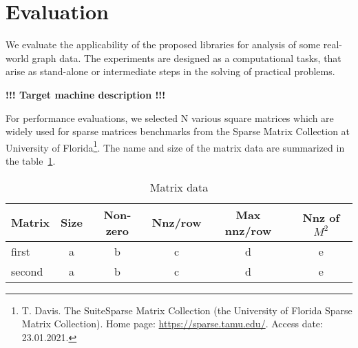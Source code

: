 \section{Evaluation}



We evaluate the applicability of the proposed libraries for analysis of some real-world graph data.
The experiments are designed as a computational tasks, that arise as stand-alone or intermediate steps
in the solving of practical problems.  

\textbf{!!! Target machine description !!!}

For performance evaluations, we selected N various square matrices which are widely used for sparse matrices benchmarks
from the Sparse Matrix Collection at University of Florida\footnote{T. Davis. The SuiteSparse Matrix Collection (the University of Florida Sparse Matrix Collection). Home page: \url{https://sparse.tamu.edu/}. Access date: 23.01.2021.}.
The name and size of the matrix data are summarized in the table~\ref{table:sparse_matrices}. 




{\setlength{\tabcolsep}{0.3em}
\begin{table}
\centering
{
\caption{Matrix data}
\label{table:sparse_matrices}
\scriptsize
{}
\begin{tabular}{|l|c|c|c|c|c|}
\hline
Matrix          & Size       & Non-zero   & Nnz/row   & Max nnz/row & Nnz of $M^2$ \\
\hline
\hline
first           & a          & b          & c         & d            & e              \\
second          & a          & b          & c         & d            & e              \\
\hline
\end{tabular}
}
\end{table}
}